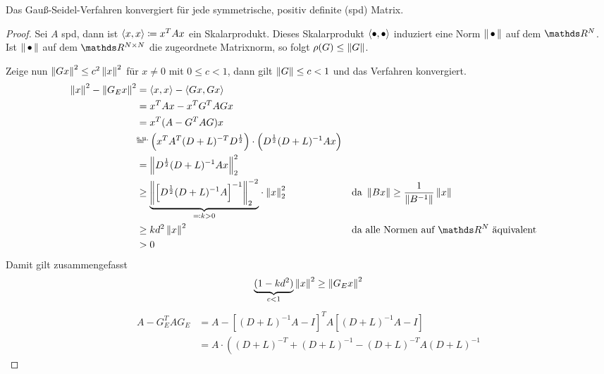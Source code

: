 \begin{Satze}
  Das Gauß-Seidel-Verfahren konvergiert für jede symmetrische, positiv
  definite (spd) Matrix.

  \begin{proof}
    Sei $A$ spd, dann ist $\scp{x}{x}\coloneqq x^T Ax$ ein Skalarprodukt.
    Dieses Skalarprodukt $\scp{\bullet}{\bullet}$ induziert eine
    Norm $\nn$ auf dem $\R^N$.
    Ist $\nn$ auf dem $\R^{N\times N}$ die zugeordnete
    Matrixnorm, so folgt $\rho(G) \leq \nn[G]$.

    Zeige nun $\nn[Gx]^2\leq c^2\nn[x]^2$ für $x\neq 0$ mit $0\leq c<1$,
    dann gilt $\nn[G]\leq c<1$ und das Verfahren konvergiert.
    \begin{align*}
      \nn[x]^2-\nn[G_Ex]^2 &= \scp{x}{x}-\scp{Gx}{Gx} \\
                           &= x^TAx-x^TG^TAGx \\
                           &=x^T(A-G^TAG)x\\
                           &\mathrlap{=}^\text{s.u.} \left(
                             x^TA^T(D+L)^{-T}D^{\frac{1}{2}}
                             \right)
                             \cdot \left(
                             D^{\frac{1}{2}}(D+L)^{-1}Ax
                             \right)\\
                           &=\nn[D^{\frac{1}{2}}(D+L)^{-1}Ax]_2^2\\
                           &\geq {\underbrace{%
                             \nn[{\left[
                             D^{\frac{1}{2}}(D+L)^{-1}A
                             \right]^{-1}}]_2^{-2}}_{%
                             \eqqcolon k>0}}
                             \cdot\nn[x]_2^{2}
                           && \text{da } \nn[Bx]\geq \frac{1}{\nn[B^{-1}]}\nn[x]\\
                           &\geq kd^2\nn[x]^2
                           &&\text{da alle Normen auf $\R^N$ äquivalent}\\
                           &>0
    \end{align*}
    Damit gilt zusammengefasst
    \begin{gather*}
      \underbrace{(1-kd^2)}_{c<1}\nn[x]^2\geq \nn[G_Ex]^2
    \end{gather*}
    \begin{align*}
      A-G_E^TAG_E &=A-\left[(D+L)^{-1}A-I\right]^TA\left[(D+L)^{-1}A-I\right]\\
                  &=A\cdot \left(
                    (D+L)^{-T}+(D+L)^{-1}-(D+L)^{-T}A(D+L)^{-1}

\end{align*}
\end{proof}
\end{Satze}

